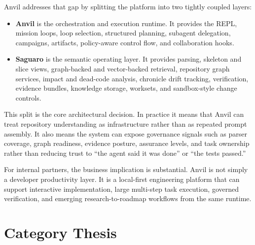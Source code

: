 \documentclass[11pt,a4paper]{article}
\begin{document}
Anvil addresses that gap by splitting the platform into two tightly coupled layers:
\begin{itemize}
    \item \textbf{Anvil} is the orchestration and execution runtime. It provides the REPL, mission loops, loop selection, structured planning, subagent delegation, campaigns, artifacts, policy-aware control flow, and collaboration hooks.
    \item \textbf{Saguaro} is the semantic operating layer. It provides parsing, skeleton and slice views, graph-backed and vector-backed retrieval, repository graph services, impact and dead-code analysis, chronicle drift tracking, verification, evidence bundles, knowledge storage, worksets, and sandbox-style change controls.
\end{itemize}

This split is the core architectural decision. In practice it means that Anvil can treat repository understanding as infrastructure rather than as repeated prompt assembly. It also means the system can expose governance signals such as parser coverage, graph readiness, evidence posture, assurance levels, and task ownership rather than reducing trust to ``the agent said it was done'' or ``the tests passed.''

For internal partners, the business implication is substantial. Anvil is not simply a developer productivity layer. It is a local-first engineering platform that can support interactive implementation, large multi-step task execution, governed verification, and emerging research-to-roadmap workflows from the same runtime.

\section{Category Thesis}
\end{document}
